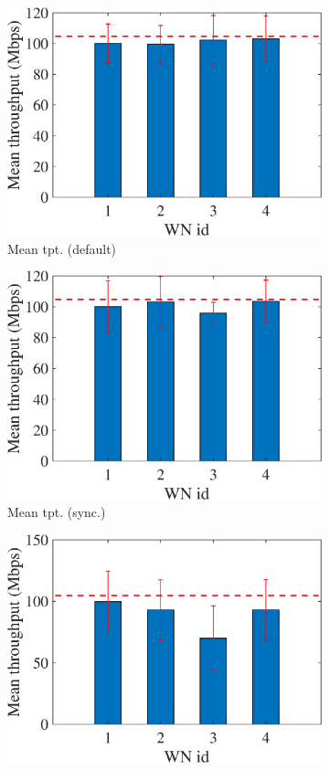 \documentclass[preprint,12pt]{article}
\begin{document}
\begin{figure}[h!]
\begin{subfigure}[b]{.3\textwidth}
		\includegraphics[width=\textwidth]{images/mean_tpt_EG}
		\caption{Mean tpt. (default)}\label{fig:mean_tpt_EG}
	\end{subfigure}
	\begin{subfigure}[b]{.3\textwidth}
		\includegraphics[width=\textwidth]{images/mean_tpt_OEG}
		\caption{Mean tpt. (sync.)}\label{fig:mean_tpt_OEG}
	\end{subfigure}
	\begin{subfigure}[b]{.3\textwidth}
		\includegraphics[width=\textwidth]{images/mean_tpt_CEG}

\end{subfigure}
\end{figure}
\end{document}
